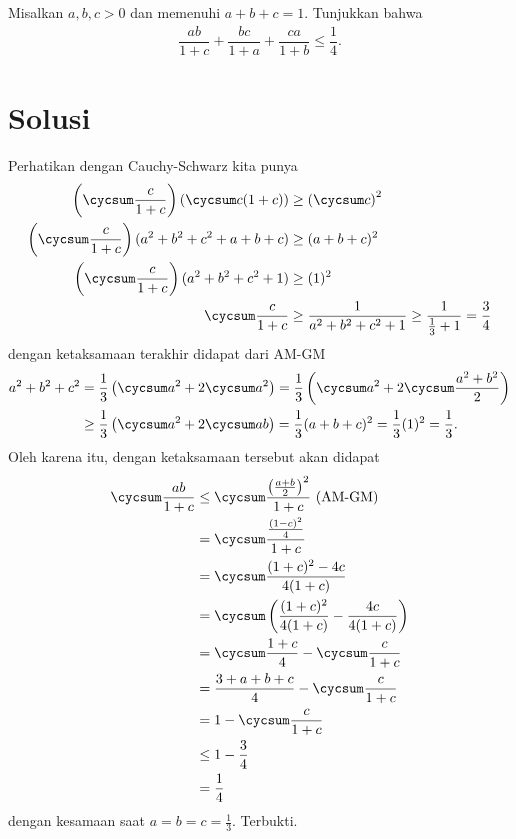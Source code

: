 Misalkan $a,b,c > 0$ dan memenuhi $a+b+c=1$. Tunjukkan bahwa
\begin{align*}
\dfrac{ab}{1+c}+\dfrac{bc}{1+a}+\dfrac{ca}{1+b} \le \dfrac{1}{4}.
\end{align*}

\newpage
\section{Solusi}
Perhatikan dengan Cauchy-Schwarz kita punya
\begin{align*}
    \left(\cycsum \dfrac{c}{1+c}\right)\left(\cycsum c(1+c)\right) &\ge \left(\cycsum c \right)^2\\
    \left(\cycsum \dfrac{c}{1+c}\right)(a^2+b^2+c^2+a+b+c) &\ge (a+b+c)^2\\
     \left(\cycsum \dfrac{c}{1+c}\right)(a^2+b^2+c^2+1) &\ge (1)^2\\
     \cycsum \dfrac{c}{1+c} &\ge \dfrac{1}{a^2+b^2+c^2+1} \ge \dfrac{1}{\frac{1}{3}+1} = \dfrac{3}{4}\\
\end{align*}
dengan ketaksamaan terakhir didapat dari AM-GM
\begin{align*}
    a^2+b^2+c^2 &= \dfrac{1}{3}\left(\cycsum a^2 + 2\cycsum a^2\right)
    = \dfrac{1}{3}\left(\cycsum a^2 + 2\cycsum \dfrac{a^2+b^2}{2}\right)\\
    &\ge \dfrac{1}{3}\left(\cycsum a^2 + 2\cycsum ab\right)
    = \dfrac{1}{3}(a+b+c)^2 = \dfrac{1}{3}(1)^2 = \dfrac{1}{3}.
\end{align*}
Oleh karena itu, dengan ketaksamaan tersebut akan didapat
\begin{align*}
    \cycsum \dfrac{ab}{1+c} 
    &\le \cycsum \dfrac{\left(\frac{a+b}{2}\right)^2}{1+c} \text{   (AM-GM)}\\
    &= \cycsum \dfrac{\frac{(1-c)^2}{4}}{1+c}\\
    &= \cycsum \dfrac{(1+c)^2-4c}{4(1+c)}\\
    &= \cycsum \left( \dfrac{(1+c)^2}{4(1+c)} - \dfrac{4c}{4(1+c)} \right)\\
    &= \cycsum \dfrac{1+c}{4} - \cycsum \dfrac{c}{1+c}\\
    &= \dfrac{3+a+b+c}{4} - \cycsum \dfrac{c}{1+c}\\
    &= 1 - \cycsum \dfrac{c}{1+c}\\
    &\le 1 - \dfrac{3}{4}\\
    &= \dfrac{1}{4}
\end{align*}
dengan kesamaan saat $a=b=c=\frac{1}{3}$. Terbukti.